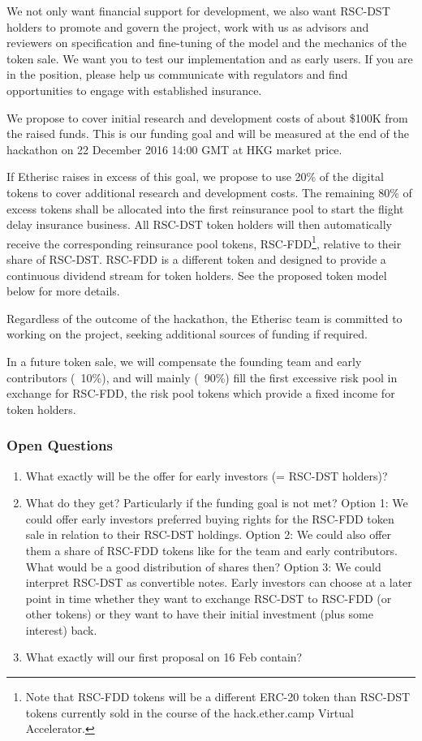 \documentclass[12pt]{article}
\begin{document}
We not only want financial support for development, we also want RSC-DST holders to promote and govern the project, work with us as advisors and reviewers on specification and fine-tuning of the model and the mechanics of the token sale. We want you to test our implementation and as early users. If you are in the position, please help us communicate with regulators and find opportunities to engage with established insurance.

We propose to cover initial research and development costs of about \$100K from the raised funds. This is our funding goal and will be measured at the end of the hackathon on 22 December 2016 14:00 GMT at HKG market price.

If Etherisc raises in excess of this goal, we propose to use 20\% of the digital tokens to cover additional research and development costs. The remaining 80\% of excess tokens shall be allocated into the first reinsurance pool to start the flight delay insurance business. All RSC-DST token holders will then automatically receive the corresponding reinsurance pool tokens, RSC-FDD\footnote{Note that RSC-FDD tokens will be a different ERC-20 token than RSC-DST tokens currently sold in the course of the hack.ether.camp Virtual Accelerator.}, relative to their share of RSC-DST. RSC-FDD is a different token and designed to provide a continuous dividend stream for token holders. See the proposed token model below for more details.

Regardless of the outcome of the hackathon, the Etherisc team is committed to working on the project, seeking additional sources of funding if required. 

In a future token sale, we will compensate the founding team and early contributors (~10\%), and will mainly (~90\%) fill the first excessive risk pool in exchange for RSC-FDD, the risk pool tokens which provide a fixed income for token holders.

\subsubsection{Open Questions}

\begin{enumerate}
    \item What exactly will be the offer for early investors (= RSC-DST holders)? 
    \item What do they get? Particularly if the funding goal is not met? Option 1: We could offer early investors preferred buying rights for the RSC-FDD token sale in relation to their RSC-DST holdings. Option 2: We could also offer them a share of RSC-FDD tokens like for the team and early contributors. What would be a good distribution of shares then? Option 3: We could interpret RSC-DST as convertible notes. Early investors can choose at a later point in time whether they want to exchange RSC-DST to RSC-FDD (or other tokens) or they want to have their initial investment (plus some interest) back.
    \item What exactly will our first proposal on 16 Feb contain?
\end{enumerate}
\end{document}
